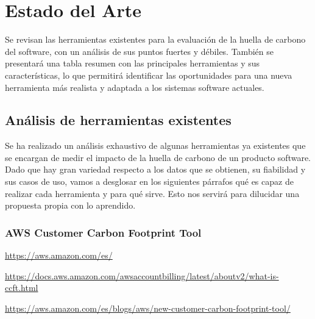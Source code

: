 \documentclass[12pt,a4paper]{report}
\begin{document}
\chapter{Estado del Arte}

Se revisan las herramientas existentes para la evaluación de la huella de
carbono del software, con un análisis de sus puntos fuertes y débiles. También
se presentará una tabla resumen con las principales herramientas y sus
características, lo que permitirá identificar las oportunidades para una nueva
herramienta más realista y adaptada a los sistemas software actuales.

\section{Análisis de herramientas existentes}

Se ha realizado un análisis exhaustivo de algunas herramientas ya existentes
que se encargan de medir el impacto de la huella de carbono de un producto
software. Dado que hay gran variedad respecto a los datos que se obtienen, su
fiabilidad y sus casos de uso, vamos a desglosar en los siguientes párrafos qué
es capaz de realizar cada herramienta y para qué sirve. Esto nos servirá para
dilucidar una propuesta propia con lo aprendido.

\subsection*{AWS Customer Carbon Footprint Tool}
\href{https://aws.amazon.com/es/}{https://aws.amazon.com/es/}

\href{https://docs.aws.amazon.com/awsaccountbilling/latest/aboutv2/what-is-ccft.html}{https://docs.aws.amazon.com/awsaccountbilling/latest/aboutv2/what-is-ccft.html}

\href{https://aws.amazon.com/es/blogs/aws/new-customer-carbon-footprint-tool/}{https://aws.amazon.com/es/blogs/aws/new-customer-carbon-footprint-tool/}
\end{document}
